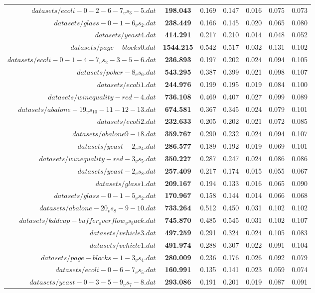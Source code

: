 \begin{table}[!ht]
{\begin{tabular}{r c c c c c c}
$datasets/ecoli-0-2-6-7_vs_3-5.dat$ & \textbf{198.043} & 0.169 & 0.147 & 0.016 & 0.075 & 0.073 \\
$datasets/glass-0-1-6_vs_2.dat$ & \textbf{238.449} & 0.166 & 0.145 & 0.020 & 0.065 & 0.080 \\
$datasets/yeast4.dat$ & \textbf{414.291} & 0.217 & 0.210 & 0.014 & 0.048 & 0.052 \\
$datasets/page-blocks0.dat$ & \textbf{1544.215} & 0.542 & 0.517 & 0.032 & 0.131 & 0.102 \\
$datasets/ecoli-0-1-4-7_vs_2-3-5-6.dat$ & \textbf{236.893} & 0.197 & 0.202 & 0.024 & 0.094 & 0.105 \\
$datasets/poker-8_vs_6.dat$ & \textbf{543.295} & 0.387 & 0.399 & 0.021 & 0.098 & 0.107 \\
$datasets/ecoli1.dat$ & \textbf{244.976} & 0.199 & 0.195 & 0.019 & 0.084 & 0.100 \\
$datasets/winequality-red-4.dat$ & \textbf{736.108} & 0.469 & 0.407 & 0.027 & 0.099 & 0.089 \\
$datasets/abalone-19_vs_10-11-12-13.dat$ & \textbf{674.581} & 0.367 & 0.345 & 0.024 & 0.079 & 0.101 \\
$datasets/ecoli2.dat$ & \textbf{232.633} & 0.205 & 0.202 & 0.021 & 0.072 & 0.085 \\
$datasets/abalone9-18.dat$ & \textbf{359.767} & 0.290 & 0.232 & 0.024 & 0.094 & 0.107 \\
$datasets/yeast-2_vs_4.dat$ & \textbf{286.577} & 0.189 & 0.192 & 0.019 & 0.069 & 0.101 \\
$datasets/winequality-red-3_vs_5.dat$ & \textbf{350.227} & 0.287 & 0.247 & 0.024 & 0.086 & 0.086 \\
$datasets/yeast-2_vs_8.dat$ & \textbf{257.409} & 0.217 & 0.174 & 0.015 & 0.055 & 0.067 \\
$datasets/glass1.dat$ & \textbf{209.167} & 0.194 & 0.133 & 0.016 & 0.065 & 0.090 \\
$datasets/glass-0-1-5_vs_2.dat$ & \textbf{170.967} & 0.158 & 0.144 & 0.014 & 0.066 & 0.068 \\
$datasets/abalone-20_vs_8-9-10.dat$ & \textbf{733.264} & 0.512 & 0.450 & 0.031 & 0.102 & 0.102 \\
$datasets/kddcup-buffer_overflow_vs_back.dat$ & \textbf{745.870} & 0.485 & 0.545 & 0.031 & 0.102 & 0.107 \\
$datasets/vehicle3.dat$ & \textbf{497.259} & 0.291 & 0.324 & 0.024 & 0.105 & 0.083 \\
$datasets/vehicle1.dat$ & \textbf{491.974} & 0.288 & 0.307 & 0.022 & 0.091 & 0.104 \\
$datasets/page-blocks-1-3_vs_4.dat$ & \textbf{280.009} & 0.236 & 0.176 & 0.026 & 0.092 & 0.079 \\
$datasets/ecoli-0-6-7_vs_5.dat$ & \textbf{160.991} & 0.135 & 0.141 & 0.023 & 0.059 & 0.074 \\
$datasets/yeast-0-3-5-9_vs_7-8.dat$ & \textbf{293.086} & 0.191 & 0.201 & 0.019 & 0.087 & 0.091 \\
\end{tabular}}
\end{table}
